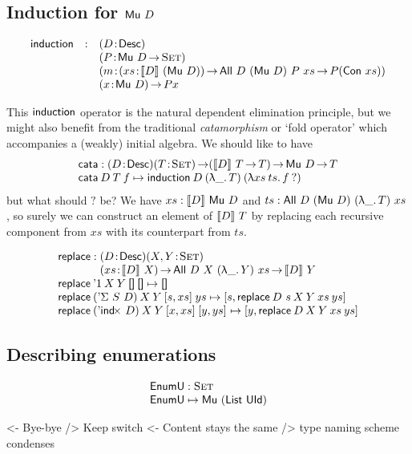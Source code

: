 \documentclass[preprint, authoryear]{sigplanconf}
\newenvironment{structure}{\footnotesize\verbatim}{\endverbatim}
\begin{document}
\subsection{Induction for $\Mu{D}$}

\[
\begin{array}{lcl}
\F{induction} & : & \PITEL{D}{\Desc}                \\
              &   & \PITEL{P}{\Mu{D} \To \Set}      \\
              &   & \PITEL{m}{\PI{xs}{\descop{D}{(\Mu{D})}} \All{D}{(\Mu{D})}{P}{xs} \To P (\Con{xs})} \\
              &   & \PI{x}{\Mu{D}} P x
\end{array}
\]

This \(\F{induction}\) operator is the natural dependent elimination
principle, but we might also benefit from the traditional \emph{catamorphism}
or `fold operator' which accompanies a (weakly) initial algebra. We should
like to have
\[\stk{
\F{cata} : \PITEL{D}{\Desc}\PI{T}{\Set}
           (\descop{D}{T}\To T)\To \Mu{D}\To T\\
\F{cata}\:D\:T\:f \mapsto
  \F{induction}\:D\:(\LAM{\_}T)\:(\LAM{xs\:ts}f\:?)
}\]
but what should \(?\) be? We have \(xs:\descop{D}{\Mu{D}}\)
and \(ts:\All{D}{(\Mu{D})}{(\LAM{\_}T)}{xs}\), so surely we can construct
an element of \(\descop{D}{T}\) by replacing each recursive component from
\(xs\) with its counterpart from \(ts\).

\[\stk{
\F{replace} : 
\stk{\PITEL{D}{\Desc}\PITEL{X,Y}{\Set}\\
           \PI{xs}{\descop{D}{X}} \All{D}{X}{(\LAM{\_}Y)}{xs} \To
           \descop{D}{Y}}
\\
\F{replace}\:\DUnit\: X\:Y\:\Void\:\Void\mapsto\Void \\
\F{replace}\:(\DSigma{S}{D})\:X\:Y\:\pair{s}{xs}{}\:ys\mapsto
 \pair{s}{\F{replace}\:{D~s}\:X\:Y\:xs\:ys}{}         \\
\F{replace}\:(\DIndx{D})\:X\:Y\:\pair{x}{xs}{}\:\pair{y}{ys}{} \mapsto
    \pair{y}{\F{replace}\:D\:X\:Y\:xs\:ys}{}
}\]

\subsection{Describing enumerations}

\[\stk{
\EnumU : \Set \\
\EnumU \mapsto \Mu{(\List~\UId)}
}\]


\begin{structure}
<- Bye-bye \spi
    /> Keep switch
<- Content stays the same
    /> type naming scheme condenses
\end{structure}
\end{document}
